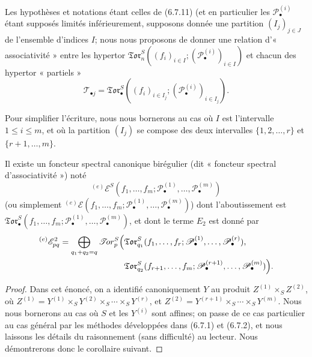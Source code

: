 \begin{env}[6.8.1]
Les hypothèses et notations étant celles de (6.7.11) (et en particulier les
$\mathscr P_\bullet^{(i)}$ étant supposés limités inférieurement, supposons
donnée une partition $(I_j)_{j\in J}$ de l'ensemble d'indices $I$; nous nous
proposons de donner une relation d'« associativité » entre les hypertor
$\mathfrak{Tor}_n^S((f_i)_{i\in I};(\mathscr P_\bullet^{(i)})_{i\in I})$ et
chacun des hypertor « partiels »
\[
  \mathcal T_{\bullet j}
  =\mathfrak{Tor}_\bullet^S
  ((f_i)_{i\in I_j};(\mathscr P_\bullet^{(i)})_{i\in I_j}).
\]

Pour simplifier l'écriture, nous nous bornerons au cas où $I$ est
l'intervalle $1\leq i\leq m$, et où la partition $(I_j)$ se compose des deux
intervalles $\{1,2,\ldots,r\}$ et $\{r+1,\ldots,m\}$.
\end{env}

\begin{proposition}[6.8.2]
Il existe un foncteur spectral canonique birégulier (dit « foncteur spectral
d'associativité ») noté
\[
  {}^{(e)}\mathscr E^S
  (f_1,\ldots,f_m;
   \mathscr P_\bullet^{(1)},\ldots,\mathscr P_\bullet^{(m)})
\]
(ou simplement ${}^{(e)}\mathscr E(f_1,\ldots,f_m;
\mathscr P_\bullet^{(1)},\ldots,\mathscr P_\bullet^{(m)})$) dont
l'aboutissement est
$\mathfrak{Tor}_\bullet^S(f_1,\ldots,f_m;
\mathscr P_\bullet^{(1)},\ldots,\mathscr P_\bullet^{(m)})$, et dont le terme
$E_2$ est donné par
\[
\begin{split}
  {}^{(e)}\mathscr E_{pq}^2
  =\bigoplus_{q_1+q_2=q}
  \mathscr{T}\!or_p^S\Bigl(
  &\mathfrak{Tor}_{q_1}^S
  (f_1,\ldots,f_r;
   \mathscr P_\bullet^{(1)},\ldots,\mathscr P_\bullet^{(r)}),\\
  &\mathfrak{Tor}_{q_2}^S
  (f_{r+1},\ldots,f_m;
   \mathscr P_\bullet^{(r+1)},\ldots,\mathscr P_\bullet^{(m)})
  \Bigr).
\end{split}
\]
\end{proposition}

\begin{proof}
Dans cet énoncé, on a identifié canoniquement $Y$ au produit
$Z^{(1)}\times_S Z^{(2)}$, où
$Z^{(1)}=Y^{(1)}\times_S Y^{(2)}\times_S\cdots\times_S Y^{(r)}$, et
$Z^{(2)}=Y^{(r+1)}\times_S\cdots\times_S Y^{(m)}$. Nous nous bornerons au
cas où $S$ et les $Y^{(i)}$ sont affines; on passe de ce cas particulier au
cas général par les méthodes développées dans (6.7.1) et (6.7.2), et nous
laissons les détails du raisonnement (sans difficulté) au lecteur. Nous
démontrerons donc le corollaire suivant.
\end{proof}

